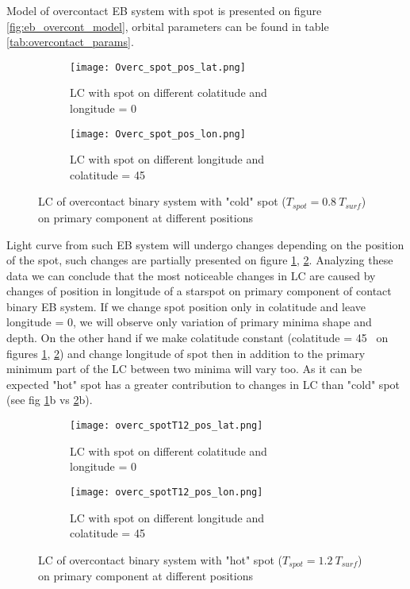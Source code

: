 Model of overcontact EB system with spot is presented on figure \ref{fig:eb_overcont_model}, orbital parameters can be found in table \ref{tab:overcontact_params}. 

\begin{figure}[!h]
    \centering
    \begin{subfigure}[t]{0.5\textwidth}
        \centering
        \texttt{[image: Overc\_spot\_pos\_lat.png]}
        \caption{LC with spot on different colatitude and \\longitude = 0\degree}
    \end{subfigure}%
    \begin{subfigure}[t]{0.5\textwidth}
        \centering
        \texttt{[image: Overc\_spot\_pos\_lon.png]}
        \caption{LC with spot on different longitude and \\colatitude = 45\degree}
    \end{subfigure}
    \caption{LC of overcontact binary system with "cold" spot ($T_{spot}=0.8~T_{surf}$) on primary component at different positions}
\label{fig:overcontact_spot_pos}
\end{figure}

Light curve from such EB system will undergo changes depending on the position of the spot, such changes are partially presented on figure \ref{fig:overcontact_spot_pos}, \ref{fig:overcontact_spotT12_pos}. Analyzing these data we can conclude that the most noticeable changes in LC are caused by changes of position in longitude of a starspot on primary component of contact binary EB system.
If we change spot position only in colatitude and leave longitude = 0\degree, we will observe only variation of primary minima shape and depth. On the other hand if we make colatitude constant (colatitude = 45\degree~ on figures \ref{fig:overcontact_spot_pos}, \ref{fig:overcontact_spotT12_pos}) and change longitude of spot then in addition to the primary minimum part of the LC between two minima will vary too. As it can be expected "hot" spot has a greater contribution to changes in LC than "cold" spot (see fig \ref{fig:overcontact_spot_pos}b vs \ref{fig:overcontact_spotT12_pos}b). 

\begin{figure}[!h]
    \centering
    \begin{subfigure}[t]{0.5\textwidth}
        \centering
        \texttt{[image: overc\_spotT12\_pos\_lat.png]}
        \caption{LC with spot on different colatitude and \\longitude = 0\degree}
    \end{subfigure}%
    \begin{subfigure}[t]{0.5\textwidth}
        \centering
        \texttt{[image: overc\_spotT12\_pos\_lon.png]}
        \caption{LC with spot on different longitude and \\colatitude = 45\degree}
    \end{subfigure}
    \caption{LC of overcontact binary system with "hot" spot ($T_{spot}=1.2~T_{surf}$) on primary component at different positions}
\label{fig:overcontact_spotT12_pos}
\end{figure}

